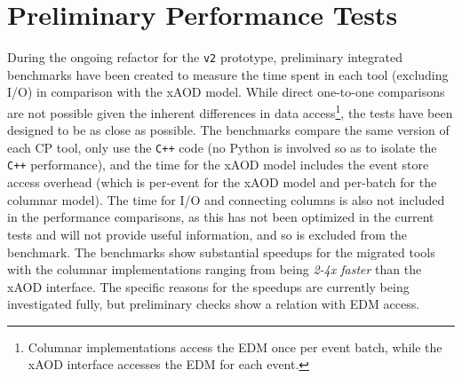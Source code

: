\section{Preliminary Performance Tests}\label{sec:performance}

During the ongoing refactor for the \texttt{v2} prototype, preliminary integrated benchmarks have been created to measure the time spent in each tool (excluding I/O) in comparison with the xAOD model.
While direct one-to-one comparisons are not possible given the inherent differences in data access\footnote{Columnar implementations access the EDM once per event batch, while the xAOD interface accesses the EDM for each event.}, the tests have been designed to be as close as possible.
The benchmarks compare the same version of each CP tool, only use the \texttt{C++} code (no Python is involved so as to isolate the \texttt{C++} performance), and the time for the xAOD model includes the event store access overhead (which is per-event for the xAOD model and per-batch for the columnar model).
The time for I/O and connecting columns is also not included in the performance comparisons, as this has not been optimized in the current tests and will not provide useful information, and so is excluded from the benchmark.
The benchmarks show substantial speedups for the migrated tools with the columnar implementations ranging from being \emph{2-4x faster} than the xAOD interface.
The specific reasons for the speedups are currently being investigated fully, but preliminary checks show a relation with EDM access.
